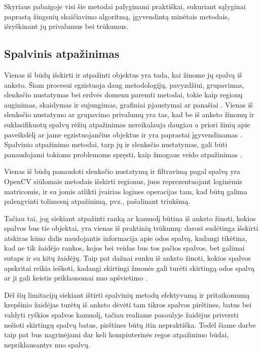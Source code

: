 \documentclass{VUMIFPSbakalaurinis}
\begin{document}
Skyriaus pabaigoje visi šie metodai palyginami praktiškai, sukuriant sąlyginai paprastą žingsnių skaičiavimo algoritmą, įgyvendintą minėtais metodais, išryškinant jų privalumus bei trūkumus. 

\subsection{Spalvinis atpažinimas}
Vienas iš būdų išskirti ir atpažinti objektus yra tada, kai žinome jų spalvą iš anksto. Šiam procesui egzistuoja daug metodologijų, pavyzdžiui, grupavimas, slenksčio nustatymas bei erdvės domenu paremti metodai, tokie kaip regionų auginimas, skaidymas ir sujungimas, grafiniai pjaustymai ar panašiai \cite{segmentation_trends}. Vienas iš slenksčio nustatymo ar grupavimo privalumų yra tas, kad be iš anksto žinomų ir suklasifikuotų spalvų rėžių atpažinimas nereikalauja daugiau a priori žinių apie paveikslėlį ar jame egzistuojančius objektus ir yra paprastai įgyvendinamas \cite{segmentation_trends}. Spalvinio atpažinimo metodai, tarp jų ir slenksčio nustatymas, gali būti panaudojami tokioms problemoms spręsti, kaip žmogaus veido atpažinimas \cite{WANG20011983}.

Vienas iš būdų panaudoti slenksčio nustatymą ir filtravimą pagal spalvą yra OpenCV siūlomais metodais išskirti regionus, juos reprezentuojant loginėmis matricomis, ir su jomis atlikti įvairias logines operacijas tam, kad būtų galima palengvinti tolimesnį atpažinimą, pvz., pašalinant triukšmą. 

Tačiau tai, jog siekiant atpažinti ranką ar kamuolį būtina iš anksto žinoti, kokios spalvos bus tie objektai, yra vienas iš praktinių trūkumų: darosi sudėtinga išskirti atskiras kūno dalis naudojantis informacija apie odos spalvą, kadangi tikėtina, kad ne tik žaidėjo rankos, kojos bei veidas bus tos pačios spalvos, bet galimai sutaps ir su kitų žaidėjų. Taip pat dažnai sunku iš anksto žinoti, kokios spalvos apskritai reikia ieškoti, kadangi skirtingi žmonės gali turėti skirtingą odos spalvą ar ji gali keistis priklausomai nuo apšvietimo \cite{KAKUMANU20071106}. 

Dėl šių limitacijų siekiant ištirti spalvinių metodų efektyvumą ir pritaikomumą krepšinio žaidėjas turėtų iš anksto dėvėti tam tikros spalvos pirštines, batus bei valdyti ryškios spalvos kamuolį, tačiau realiame pasaulyje žaidėjus priversti nešioti skirtingų spalvų batus, pirštines būtų itin nepraktiška. Todėl šiame darbe taip pat bus nagrinėjami dar keli kompiuterinės regos atpažinimo būdai, nepriklausantys nuo spalvų. 
\end{document}
